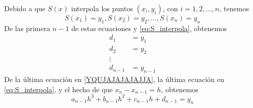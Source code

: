 \begin{tcolorbox}[
        arc=0mm, 
        bottomtitle=0.5mm,
        boxrule=0mm,
        colbacktitle=black!10!white, 
        coltitle=black,
        left=2.5mm,
        leftrule=1mm,
        right=3.5mm,
        title={$S(x)$ interpola los puntos $(x_i, y_i)$ con $i = 1, 2, \dots, n$.},
        toptitle=0.75mm,
        colframe=black!30!white,
    ]
    Debido a que $S(x)$ interpola los puntos $(x_i, y_i)$, con $i = 1, 2, \dots, n$, tenemos
    \begin{equation}
        S(x_1) = y_1, S(x_2) = y_2, \dots, S(x_n) = y_n \label{YQUJAJAJAJAJJA}
    \end{equation}
    De las primera $n - 1$ de estas ecuaciones y \eqref{eq:S_interpola}, obtenemos
    \begin{equation}
        \begin{aligned}
            d_1 & = y_1 \\
            d_2 & = y_2 \\
            \vdots & \\
            d_{n-1} & = y_{n-1}
        \end{aligned} \label{UAJAJJAUAUHVCFATQHH}
    \end{equation}
    De la última ecuación en \eqref{YQUJAJAJAJAJJA}, la última ecuación en \eqref{eq:S_interpola}, y el hecho de que $x_n - x_{n-1} = h$, obtenemos
    \begin{equation}
        a_{n-1}h^3 + b_{n-1}h^2 + c_{n-1}h + d_{n-1} = y_n \label{UAJAJAHHCCFGYYQUYQHUU}
    \end{equation}
\end{tcolorbox}

\newpage

